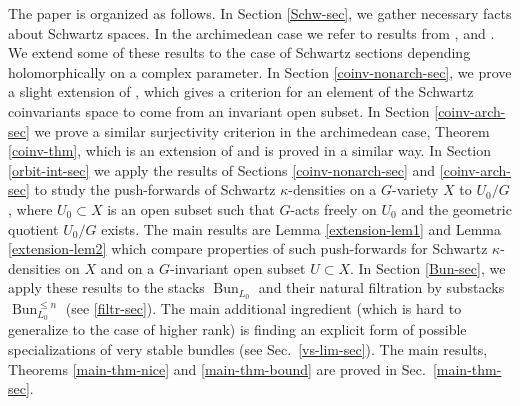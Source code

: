 \documentclass[12pt,reqno]{amsart}
\theoremstyle{definition}
\theoremstyle{remark}
\numberwithin{equation}{section}
\renewcommand{\SS}{{\mathcal S}}
\newcommand{\sub}{\subset}
\newcommand{\Bun}{{\operatorname{Bun}}}
\begin{document}
The paper is organized as follows. In Section \ref{Schw-sec}, we gather necessary facts about Schwartz spaces. In the archimedean case we refer to
results from \cite{AG}, \cite{AGS} and \cite{AG-sm-tr}. We extend some of these results to the case of Schwartz sections depending holomorphically on a complex
parameter. In Section \ref{coinv-nonarch-sec}, we prove a slight extension of \cite[Thm.\ 6.9]{BZ}, which gives a criterion for an element of the Schwartz coinvariants space
to come from an invariant open subset. 
In Section \ref{coinv-arch-sec} we prove a similar surjectivity criterion in the archimedean case, Theorem \ref{coinv-thm}, which is an extension of \cite[Thm.\ B.0.2]{AG-sm-tr}
and is proved in a similar way.
In Section \ref{orbit-int-sec} we apply the results of Sections \ref{coinv-nonarch-sec} and \ref{coinv-arch-sec} to study the push-forwards of Schwartz $\kappa$-densities on a $G$-variety $X$
to $U_0/G$, where $U_0\sub X$ is an open subset such that $G$-acts freely on $U_0$ and the geometric quotient $U_0/G$ exists. 
The main results are Lemma \ref{extension-lem1} and Lemma \ref{extension-lem2} which compare properties of such push-forwards for Schwartz $\kappa$-densities on $X$ and on
a $G$-invariant open subset $U\sub X$. 
In Section \ref{Bun-sec}, we apply these results to the stacks $\Bun_{L_0}$ and their natural filtration by substacks $\Bun_{L_0}^{\le n}$ (see \ref{filtr-sec}).
The main additional ingredient (which is hard to generalize to the case of higher rank) is finding an explicit form of possible specializations of very stable bundles (see
Sec.\ \ref{vs-lim-sec}). The main results, Theorems \ref{main-thm-nice} and \ref{main-thm-bound} are proved in Sec.\ \ref{main-thm-sec}.
\end{document}
